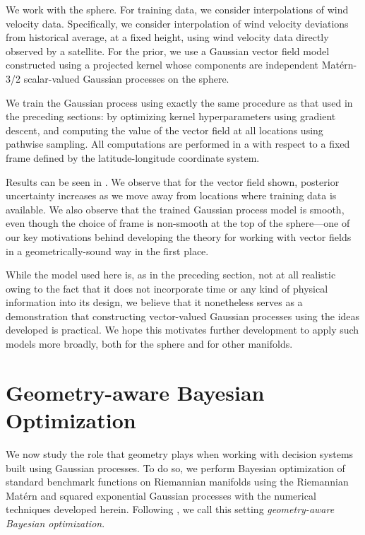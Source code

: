 \documentclass[11pt]{book}
\begin{document}
We work with the sphere.
For training data, we consider interpolations of wind velocity data.
Specifically, we consider interpolation of wind velocity deviations from historical average, at a fixed height, using wind velocity data directly observed by a satellite.
For the prior, we use a Gaussian vector field model constructed using a projected kernel whose components are independent Matérn-3/2 scalar-valued Gaussian processes on the sphere.

We train the Gaussian process using exactly the same procedure as that used in the preceding sections: by optimizing kernel hyperparameters using gradient descent, and computing the value of the vector field at all locations using pathwise sampling.
All computations are performed in a with respect to a fixed frame defined by the latitude-longitude coordinate system.

Results can be seen in .
We observe that for the vector field shown, posterior uncertainty increases as we move away from locations where training data is available.
We also observe that the trained Gaussian process model is smooth, even though the choice of frame is non-smooth at the top of the sphere---one of our key motivations behind developing the theory for working with vector fields in a geometrically-sound way in the first place.

While the model used here is, as in the preceding section, not at all realistic owing to the fact that it does not incorporate time or any kind of physical information into its design, we believe that it nonetheless serves as a demonstration that constructing vector-valued Gaussian processes using the ideas developed is practical.
We hope this motivates further development to apply such models more broadly, both for the sphere and for other manifolds.

\section{Geometry-aware Bayesian Optimization}

We now study the role that geometry plays when working with decision systems built using Gaussian processes.
To do so, we perform Bayesian optimization of standard benchmark functions on Riemannian manifolds using the Riemannian Matérn and squared exponential Gaussian processes with the numerical techniques developed herein.
Following \textcite{jaquier20}, we call this setting \emph{geometry-aware Bayesian optimization}.
\end{document}
